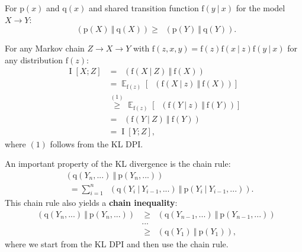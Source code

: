 \documentclass[25pt,a0paper,landscape]{tikzposter}
\DeclareMathOperator{\opExpectation}{\mathbb{E}}
\newcommand{\E}[2]{\opExpectation_{#1} \left [ #2 \right ]}
\newcommand{\MidSymbol}[1][]{\:#1\:}
\newcommand{\given}{\MidSymbol[\vert]}
\DeclareMathOperator{\opMI}{I}
\newcommand{\MIof}[1]{\opMI[#1]}
\DeclareMathOperator{\opKale}{D_\mathrm{KL}}
\newcommand{\Kale}[2]{\opKale(#1 \MidSymbol[\Vert] #2)}
\newcommand{\opp}{\mathrm{p}}
\newcommand{\pof}[1]{\opp(#1)}
\newcommand{\opq}{\mathrm{q}}
\newcommand{\qof}[1]{\opq(#1)}
\newcommand{\opf}{\mathrm{f}}
\newcommand{\fof}[1]{\opf(#1)}
\newcommand{\Y}{Y}
\begin{document}
\begin{columns}
{\begin{multicols}{2}
\begin{theorybox}[title=Jenson-Shannon Divergence DPI]
  For $\mathrm{p}(x)$ and $\mathrm{q}(x)$ and shared transition function $\mathrm{f}(y \:\vert\:x)$ for the model $X \rightarrow Y$:
  $$
  \mathop{\mathrm{D_\mathrm{JSD}}}(\mathrm{p}(X) \:\Vert\: \mathrm{q}(X)) \ge \mathop{\mathrm{D_\mathrm{JSD}}}(\mathrm{p}(Y) \:\Vert\: \mathrm{q}(Y)).
  $$
  \end{theorybox}
  \begin{theorybox}[title=Mutual Information DPI]  
  For any Markov chain $Z \rightarrow X \rightarrow Y$ with $\mathrm{f}(z, x, y) = \mathrm{f}(z) \mathrm{f}(x \:\vert\:z) \mathrm{f}(y \:\vert\:x)$ for any distribution $\mathrm{f}(z)$:
  \begin{align*}
    \MIof{X;Z} &= \Kale{\fof{X \given Z}}{\fof{X}}\\
    &= \E{\fof{z}} {\Kale{\fof{X \given z}}{\fof{X}}}\\
    &\overset{(1)}{\ge} \E{\fof{z}} {\Kale{\fof{Y \given z}}{\fof{Y}}}\\
    &= \Kale{\fof{Y \given Z}}{\fof{Y}}\\
    &= \MIof{Y;Z},
  \end{align*}
  where $(1)$ follows from the KL DPI.
  \end{theorybox}
  \begin{proofbox}[title={Chain Rule of the Divergence}]
    An important property of the KL divergence is the chain rule:
    \begin{align*}
    &\Kale{\qof{\Y_n,...}}{\pof{\Y_n,...}} \\
    &\quad = \sum_{i=1}^n \Kale{\qof{\Y_i \given 
    \Y_{i-1}, ...}}{\pof{\Y_i \given \Y_{i-1}, ...}}.
    \end{align*}
    This chain rule also yields a \textbf{chain inequality}:
    \begin{align*}
    \Kale{\qof{\Y_n,...}}{\pof{\Y_n,...}} &\ge \Kale{\qof{\Y_{n-1},...}}{\pof{\Y_{n-1},...}} \\
    &...\\
    &\ge \Kale{\qof{\Y_1}}{\pof{\Y_1}},
    \end{align*}
    where we start from the KL DPI and then use the chain rule. 
  \end{proofbox}
  \begin{proofbox}[title={Proof of the DPI}]

\end{proofbox}
\end{multicols}}
\end{columns}
\end{document}
